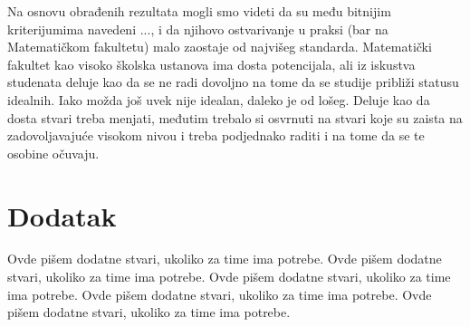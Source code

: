 \documentclass[a4paper]{article}
\begin{document}
Na osnovu obrađenih rezultata mogli smo videti da su među bitnijim kriterijumima navedeni ..., i da njihovo ostvarivanje u praksi (bar na Matematičkom fakultetu) malo zaostaje od najvišeg standarda. Matematički fakultet kao visoko školska ustanova ima dosta potencijala, ali iz iskustva studenata deluje kao da se ne radi dovoljno na tome da se studije približi statusu idealnih. Iako možda još uvek nije idealan, daleko je od lošeg. Deluje kao da dosta stvari treba menjati, međutim trebalo si osvrnuti na stvari koje su zaista na zadovoljavajuće visokom nivou i treba podjednako raditi i na tome da se te osobine očuvaju.  


\appendix
 


\appendix
\section{Dodatak}
Ovde pišem dodatne stvari, ukoliko za time ima potrebe.
Ovde pišem dodatne stvari, ukoliko za time ima potrebe.
Ovde pišem dodatne stvari, ukoliko za time ima potrebe.
Ovde pišem dodatne stvari, ukoliko za time ima potrebe.
Ovde pišem dodatne stvari, ukoliko za time ima potrebe.
\end{document}
